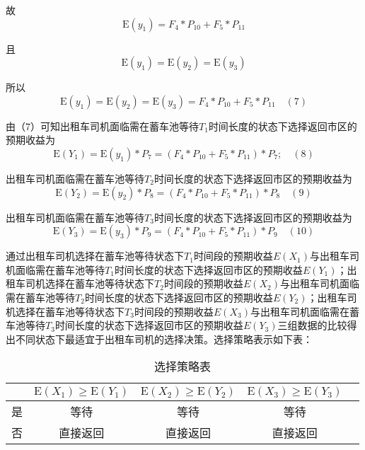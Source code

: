 \documentclass[withoutpreface,bwprint]{cumcmthesis} %
\begin{document}
故
$$\mathrm{E}\left(y_{1}\right)=F_{4} * P_{10}+F_{5} * P_{11}$$

且
$$\mathrm{E}\left(y_{1}\right)=\mathrm{E}\left(y_{2}\right)=\mathrm{E}\left(y_{3}\right)$$

所以
$$\mathrm{E}\left(y_{1}\right)=\mathrm{E}\left(y_{2}\right)=\mathrm{E}\left(y_{3}\right)=F_{4} * P_{10}+F_{5} * P_{11} \quad(7)$$

由（7）可知出租车司机面临需在蓄车池等待$T_1$时间长度的状态下选择返回市区的预期收益为$$\mathrm{E}\left(Y_{1}\right)=\mathrm{E}\left(y_{1}\right) * P_{7}=\left(F_{4} * P_{10}+F_{5} * P_{11}\right) * P_{7} ; \quad(8)$$

出租车司机面临需在蓄车池等待$T_2$时间长度的状态下选择返回市区的预期收益为
$$\mathrm{E}\left(Y_{2}\right)=\mathrm{E}\left(y_{2}\right) * P_{8}=\left(F_{4} * P_{10}+F_{5} * P_{11}\right) * P_{8} \quad(9)$$

出租车司机面临需在蓄车池等待$T_3$时间长度的状态下选择返回市区的预期收益为
$$\mathrm{E}\left(Y_{3}\right)=\mathrm{E}\left(y_{3}\right) * P_{9}=\left(F_{4} * P_{10}+F_{5} * P_{11}\right) * P_{9} \quad(10)$$

通过出租车司机选择在蓄车池等待状态下$T_1$时间段的预期收益$E(X_1)$与出租车司机面临需在蓄车池等待$T_1$时间长度的状态下选择返回市区的预期收益$E(Y_1)$；出租车司机选择在蓄车池等待状态下$T_2$时间段的预期收益$E(X_2)$与出租车司机面临需在蓄车池等待$T_2$时间长度的状态下选择返回市区的预期收益$E(Y_2)$；出租车司机选择在蓄车池等待状态下$T_3$时间段的预期收益$E(X_3)$与出租车司机面临需在蓄车池等待$T_3$时间长度的状态下选择返回市区的预期收益$E(Y_3)$三组数据的比较得出不同状态下最适宜于出租车司机的选择决策。选择策略表示如下表：
\begin{comment}
\section{绘制普通三线表格}
表格应具有三线表格式，因此常用 booktabs宏包，其标准格式如\cref{tab:001}~所示。
\end{comment}
\begin{table}[!htbp]
	\caption{选择策略表}\label{tab:001} \centering
	\begin{tabular}{ccccc}
		\toprule[1.5pt]
		  \qquad & $\mathrm{E}\left(X_{1}\right) \geq \mathrm{E}\left(Y_{1}\right)$ & $\mathrm{E}\left(X_{2}\right) \geq \mathrm{E}\left(Y_{2}\right)$ & $\mathrm{E}\left(X_{3}\right) \geq \mathrm{E}\left(Y_{3}\right)$\\
		\midrule[1pt]
		是 & 等待 & 等待 & 等待\\
		否 & 直接返回 & 直接返回 & 直接返回\\
		\bottomrule[1.5pt]
	\end{tabular}
\end{table}
\end{document}
